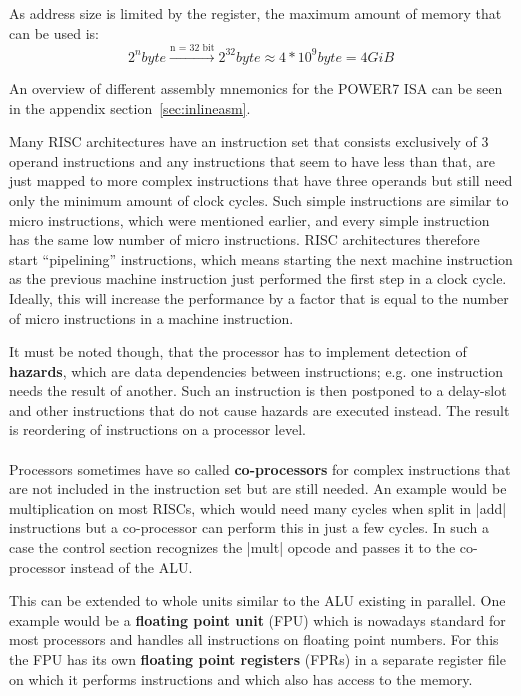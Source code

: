 As address size is limited by the register, the maximum amount of memory that can be used is:
\begin{equation}
    2^{n} byte \xrightarrow{\text{n = 32 bit}} 2^{32} byte \approx 4*10^{9} byte = 4 GiB
\end{equation}

An overview of different assembly mnemonics for the POWER7 \ac{ISA} can be seen in the appendix section~\ref{sec:inlineasm}.

Many \ac{RISC} architectures have an instruction set that consists exclusively of 3 operand instructions and any instructions that seem to have less than that, are just mapped to more complex instructions that have three operands but still need only the minimum amount of clock cycles.
Such simple instructions are similar to micro instructions, which were mentioned earlier, and every simple instruction has the same low number of micro instructions.
\ac{RISC} architectures therefore start ``pipelining'' instructions, which means starting the next machine instruction as the previous machine instruction just performed the first step in a clock cycle.
Ideally, this will increase the performance by a factor that is equal to the number of micro instructions in a machine instruction.

It must be noted though, that the processor has to implement detection of \textbf{hazards}, which are data dependencies between instructions; e.g. one instruction needs the result of another.
Such an instruction is then postponed to a delay-slot and other instructions that do not cause hazards are executed instead.
The result is reordering of instructions on a processor level.
\\
\\
Processors sometimes have so called \textbf{co-processors} for complex instructions that are not included in the instruction set but are still needed.
An example would be multiplication on most RISCs, which would need many cycles when split in |add| instructions but a co-processor can perform this in just a few cycles.
In such a case the control section recognizes the |mult| opcode and passes it to the co-processor instead of the ALU.

This can be extended to whole units similar to the ALU existing in parallel.
One example would be a \textbf{floating point unit} (FPU) which is nowadays standard for most processors and handles all instructions on floating point numbers.
For this the FPU has its own \textbf{floating point registers} (FPRs) in a separate register file on which it performs instructions and which also has access to the memory.

